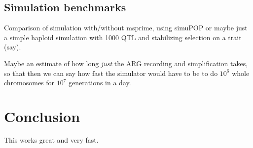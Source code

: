 \documentclass{article}
\begin{document}



\subsection*{Simulation benchmarks}

Comparison of simulation with/without msprime, using simuPOP
or maybe just a simple haploid simulation with 1000 QTL and stabilizing selection on a trait (say).

Maybe an estimate of how long \emph{just} the ARG recording and simplification takes,
so that then we can say how fast the simulator would have to be to do $10^6$ whole chromosomes for $10^7$ generations
in a day.


\section*{Conclusion}


This works great and very fast.
\end{document}
